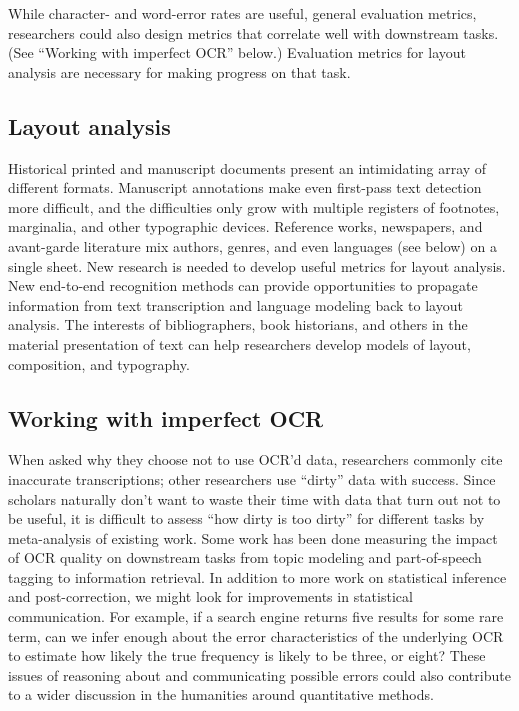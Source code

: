 \documentclass[twoside,11pt]{report}
\begin{document}
While character- and word-error rates are useful, general evaluation metrics, researchers could also design metrics that correlate well with downstream tasks. (See ``Working with imperfect OCR'' below.) Evaluation metrics for layout analysis are necessary for making progress on that task.

\subsection{Layout analysis}

Historical printed and manuscript documents present an intimidating array of different formats. Manuscript annotations make even first-pass text detection more difficult, and the difficulties only grow with multiple registers of footnotes, marginalia, and other typographic devices. Reference works, newspapers, and avant-garde literature mix authors, genres, and even languages (see below) on a single sheet. New research is needed to develop useful metrics for layout analysis. New end-to-end recognition methods can provide opportunities to propagate information from text transcription and language modeling back to layout analysis. The interests of bibliographers, book historians, and others in the material presentation of text can help researchers develop models of layout, composition, and typography.

\subsection{Working with imperfect OCR}

When asked why they choose not to use OCR'd data, researchers commonly cite inaccurate transcriptions; other researchers use ``dirty'' data with success. Since scholars naturally don't want to waste their time with data that turn out not to be useful, it is difficult to assess ``how dirty is too dirty'' for different tasks by meta-analysis of existing work. Some work has been done measuring the impact of OCR quality on downstream tasks from topic modeling and part-of-speech tagging to information retrieval. In addition to more work on statistical inference and post-correction, we might look for improvements in statistical communication. For example, if a search engine returns five results for some rare term, can we infer enough about the error characteristics of the underlying OCR to estimate how likely the true frequency is likely to be three, or eight? These issues of reasoning about and communicating possible errors could also contribute to a wider discussion in the humanities around quantitative methods.
\end{document}
